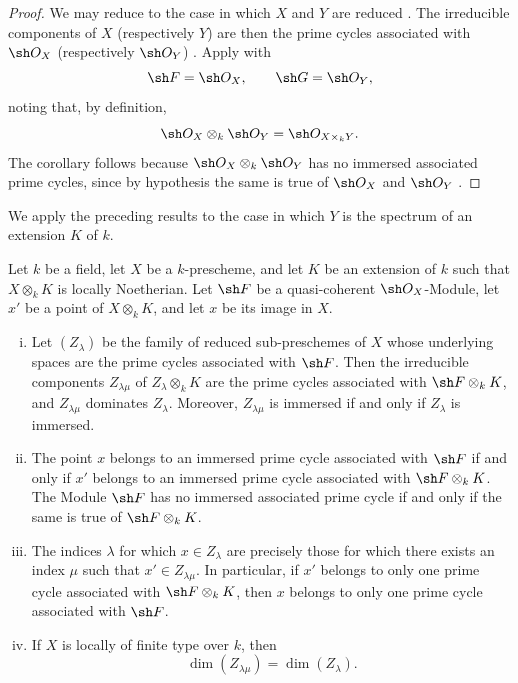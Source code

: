 \begin{proof}
We may reduce to the case in which $X$ and $Y$ are reduced
.
The irreducible components of $X$ (respectively $Y$) are then the prime
cycles associated with $\sh O_X$ (respectively $\sh O_Y$)
.
Apply  with
\[
\sh F=\sh O_X,
\qquad
\sh G=\sh O_Y,
\]
noting that, by definition,
\[
\sh O_X\otimes_k\sh O_Y=\sh O_{X\times_k Y}.
\]
The corollary follows because $\sh O_X\otimes_k\sh O_Y$ has no immersed
associated prime cycles, since by hypothesis the same is true of
$\sh O_X$ and $\sh O_Y$ .
\end{proof}

We apply the preceding results to the case in which $Y$ is the spectrum
of an extension $K$ of $k$.

\begin{proposition}[4.2.7]
\label{IV.4.2.7}
Let $k$ be a field, let $X$ be a $k$-prescheme, and let $K$ be an
extension of $k$ such that $X\otimes_k K$ is locally Noetherian.
Let $\sh F$ be a quasi-coherent $\sh O_X$-Module, let $x'$ be a point
of $X\otimes_k K$, and let $x$ be its image in $X$.
\begin{enumerate}[(i)]
\item
{}
\label{IV.4.2.7.i}
Let $(Z_\lambda)$ be the family of reduced sub-preschemes of $X$ whose
underlying spaces are the prime cycles associated with $\sh F$.
Then the irreducible components $Z_{\lambda\mu}$ of
$Z_\lambda\otimes_k K$ are the prime cycles associated with
$\sh F\otimes_k K$, and $Z_{\lambda\mu}$ dominates $Z_\lambda$.
Moreover, $Z_{\lambda\mu}$ is immersed if and only if $Z_\lambda$ is
immersed.

\item
{}
\label{IV.4.2.7.ii}
The point $x$ belongs to an immersed prime cycle associated with
$\sh F$ if and only if $x'$ belongs to an immersed prime cycle
associated with $\sh F\otimes_k K$.
The Module $\sh F$ has no immersed associated prime cycle if and only if
the same is true of $\sh F\otimes_k K$.


\item
{}
\label{IV.4.2.7.iii}
The indices $\lambda$ for which $x\in Z_\lambda$ are precisely those for
which there exists an index $\mu$ such that
$x'\in Z_{\lambda\mu}$.
In particular, if $x'$ belongs to only one prime cycle associated with
$\sh F\otimes_k K$, then $x$ belongs to only one prime cycle associated
with $\sh F$.

\item
{}
\label{IV.4.2.7.iv}
If $X$ is locally of finite type over $k$, then
\[
\dim(Z_{\lambda\mu})=\dim(Z_\lambda).
\]
\end{enumerate}
\end{proposition}

